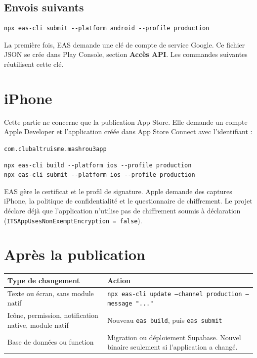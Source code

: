 \documentclass[11pt,a4paper]{article}
\newcommand{\code}[1]{\texttt{#1}}
\newcommand{\pkg}{\code{com.clubaltruisme.mashrou3app}}
\begin{document}
\subsection{Envois suivants}

\begin{verbatim}
npx eas-cli submit --platform android --profile production
\end{verbatim}

La première fois, EAS demande une clé de compte de service Google. Ce fichier JSON se crée dans Play Console, section \textbf{Accès API}. Les commandes suivantes réutilisent cette clé.

\section{iPhone}

Cette partie ne concerne que la publication App Store. Elle demande un compte Apple Developer et l'application créée dans App Store Connect avec l'identifiant :

\begin{center}
\pkg
\end{center}

\begin{verbatim}
npx eas-cli build --platform ios --profile production
npx eas-cli submit --platform ios --profile production
\end{verbatim}

EAS gère le certificat et le profil de signature. Apple demande des captures iPhone, la politique de confidentialité et le questionnaire de chiffrement. Le projet déclare déjà que l'application n'utilise pas de chiffrement soumis à déclaration (\code{ITSAppUsesNonExemptEncryption = false}).

\section{Après la publication}

\begin{center}
\begin{tabularx}{\linewidth}{@{}l X@{}}
\toprule
\textbf{Type de changement} & \textbf{Action} \\
\midrule
Texte ou écran, sans module natif &
\code{npx eas-cli update --channel production --message "..."} \\
Icône, permission, notification native, module natif &
Nouveau \code{eas build}, puis \code{eas submit} \\
Base de données ou function &
Migration ou déploiement Supabase. Nouvel binaire seulement si l'application a changé. \\
\bottomrule
\end{tabularx}
\end{center}
\end{document}
